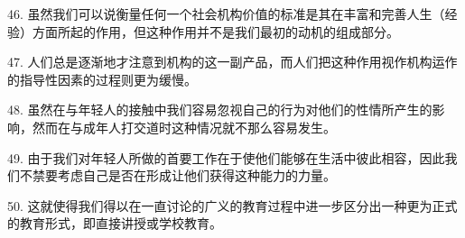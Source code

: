 46. 虽然我们可以说衡量任何一个社会机构价值的标准是其在丰富和完善人生（经验）方面所起的作用，但这种作用并不是我们最初的动机的组成部分。

47. 人们总是逐渐地才注意到机构的这一副产品，而人们把这种作用视作机构运作的指导性因素的过程则更为缓慢。

48. 虽然在与年轻人的接触中我们容易忽视自己的行为对他们的性情所产生的影响，然而在与成年人打交道时这种情况就不那么容易发生。

49. 由于我们对年轻人所做的首要工作在于使他们能够在生活中彼此相容，因此我们不禁要考虑自己是否在形成让他们获得这种能力的力量。

50. 这就使得我们得以在一直讨论的广义的教育过程中进一步区分出一种更为正式的教育形式，即直接讲授或学校教育。